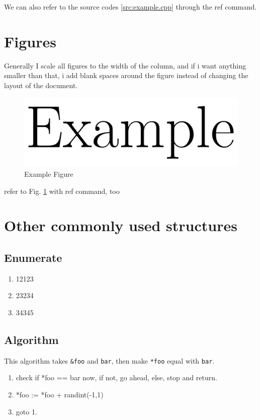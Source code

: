 \documentclass{book}
\begin{document}
We can also refer to the source codes \ref{src:example.cpp} through the ref command.

\section{Figures}

Generally I scale all figures to the width of the column, and if i want anything smaller than that, i add blank spaces around the figure instead of changing the layout of the document.

\begin{figure}
	\includegraphics[width=\columnwidth]{figs/example.png}
	\caption{Example Figure}
	\label{fig:example.png}
\end{figure}

refer to Fig. \ref{fig:example.png} with ref command, too

\section{Other commonly used structures}

\subsection{Enumerate}

\begin{enumerate}
	\item 12123
	\item 23234
	\item 34345
\end{enumerate}

\subsection{Algorithm}

\begin{algorithm}
	This algorithm takes \texttt{\&foo} and \texttt{bar}, then make \texttt{*foo} equal with \texttt{bar}.

	\begin{enumerate}
		\item check if *foo == bar now, if not, go ahead, else, stop and return.
		\item *foo := *foo + randint(-1,1)
		\item goto 1.
	\end{enumerate}
\end{algorithm}
\end{document}
